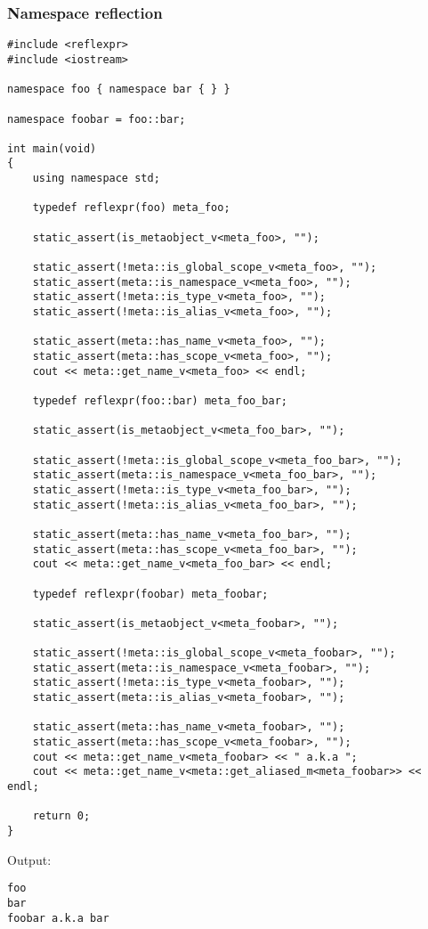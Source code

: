 \subsubsection{Namespace reflection}

\begin{verbatim}
#include <reflexpr>
#include <iostream>

namespace foo { namespace bar { } }

namespace foobar = foo::bar;

int main(void)
{
	using namespace std;

	typedef reflexpr(foo) meta_foo;

	static_assert(is_metaobject_v<meta_foo>, "");

	static_assert(!meta::is_global_scope_v<meta_foo>, "");
	static_assert(meta::is_namespace_v<meta_foo>, "");
	static_assert(!meta::is_type_v<meta_foo>, "");
	static_assert(!meta::is_alias_v<meta_foo>, "");

	static_assert(meta::has_name_v<meta_foo>, "");
	static_assert(meta::has_scope_v<meta_foo>, "");
	cout << meta::get_name_v<meta_foo> << endl;

	typedef reflexpr(foo::bar) meta_foo_bar;

	static_assert(is_metaobject_v<meta_foo_bar>, "");

	static_assert(!meta::is_global_scope_v<meta_foo_bar>, "");
	static_assert(meta::is_namespace_v<meta_foo_bar>, "");
	static_assert(!meta::is_type_v<meta_foo_bar>, "");
	static_assert(!meta::is_alias_v<meta_foo_bar>, "");

	static_assert(meta::has_name_v<meta_foo_bar>, "");
	static_assert(meta::has_scope_v<meta_foo_bar>, "");
	cout << meta::get_name_v<meta_foo_bar> << endl;

	typedef reflexpr(foobar) meta_foobar;

	static_assert(is_metaobject_v<meta_foobar>, "");

	static_assert(!meta::is_global_scope_v<meta_foobar>, "");
	static_assert(meta::is_namespace_v<meta_foobar>, "");
	static_assert(!meta::is_type_v<meta_foobar>, "");
	static_assert(meta::is_alias_v<meta_foobar>, "");

	static_assert(meta::has_name_v<meta_foobar>, "");
	static_assert(meta::has_scope_v<meta_foobar>, "");
	cout << meta::get_name_v<meta_foobar> << " a.k.a ";
	cout << meta::get_name_v<meta::get_aliased_m<meta_foobar>> << endl;

	return 0;
}
\end{verbatim}

Output:

\begin{verbatim}
foo
bar
foobar a.k.a bar
\end{verbatim}

